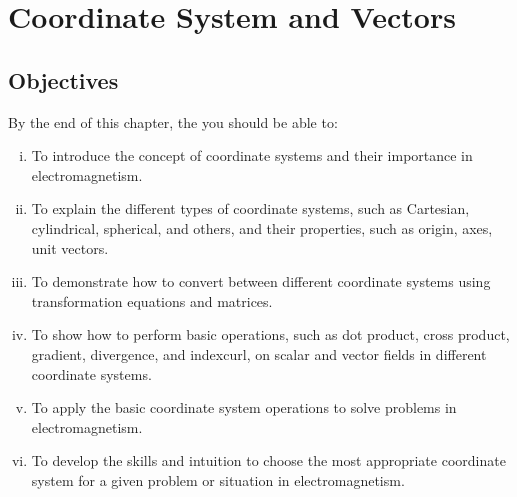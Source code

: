 \chapter{Coordinate System and Vectors}\label{lec:lec16}
\begin{mdframed}[ backgroundcolor=lightblue, linewidth=1pt, hidealllines=true]
\section{Objectives}
By the end of this chapter, the you should be able to:
\begin{enumerate}[(i)]
	\item   To introduce the concept of coordinate systems and their importance in electromagnetism. 
	\item To explain the different types of coordinate systems, such as Cartesian, cylindrical, spherical, and others, and their properties, such as origin, axes, unit vectors.
	\item To demonstrate how to convert between different coordinate systems using transformation equations and matrices.
	\item To show how to perform basic operations, such as dot product, cross product, gradient, divergence, and index{curl}, on scalar and vector fields in different coordinate systems. 
	\item To apply the basic  coordinate system operations to solve problems in electromagnetism.
	\item To develop the skills and intuition to choose the most appropriate coordinate system for a given problem or situation in electromagnetism. 	
\end{enumerate}
\end{mdframed}

